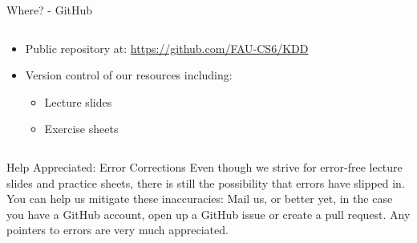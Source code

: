\begin{frame}{Where? - GitHub}
	\begin{columns}
		\begin{column}{0.7\textwidth}
			\begin{itemize}
				\item Public repository at: \url{https://github.com/FAU-CS6/KDD}
				\item Version control of our resources including:
				      \begin{itemize}
					      \item Lecture slides
					      \item Exercise sheets
				      \end{itemize}
			\end{itemize}
		\end{column}
		\begin{column}{0.3\textwidth}
			\begin{center}
			\end{center}
		\end{column}
	\end{columns}
	\vspace{5mm}
	\begin{exampleblock}{Help Appreciated: Error Corrections}
		Even though we strive for error-free lecture slides and practice sheets, there is still the possibility  that errors have slipped in. You can help us mitigate these inaccuracies: Mail us, or better yet, in the case you have a GitHub account, open up a GitHub issue or create a pull request. Any pointers to errors are very much appreciated.
	\end{exampleblock}

\end{frame}

